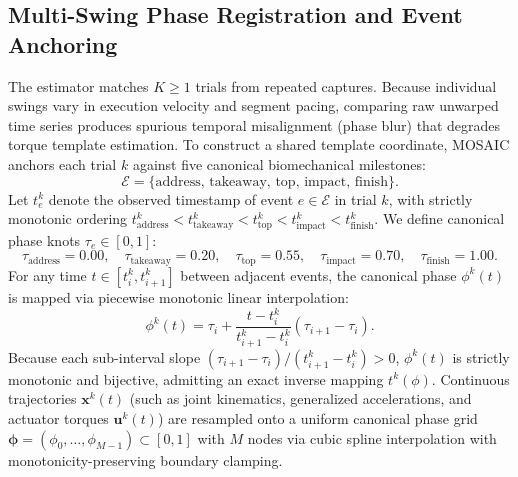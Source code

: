 \documentclass[11pt,a4paper]{article}
\newcommand{\bu}{\mathbf{u}}
\newcommand{\bx}{\mathbf{x}}
\begin{document}
\subsection{Multi-Swing Phase Registration and Event Anchoring}
\label{sec:registration}
The estimator matches $K \ge 1$ trials from repeated captures. Because individual swings vary in execution velocity and segment pacing, comparing raw unwarped time series produces spurious temporal misalignment (phase blur) that degrades torque template estimation. To construct a shared template coordinate, MOSAIC anchors each trial $k$ against five canonical biomechanical milestones:
\begin{equation}
\mathcal{E} = \{ \text{address},\, \text{takeaway},\, \text{top},\, \text{impact},\, \text{finish} \}.
\end{equation}
Let $t_e^k$ denote the observed timestamp of event $e \in \mathcal{E}$ in trial $k$, with strictly monotonic ordering $t_{\text{address}}^k < t_{\text{takeaway}}^k < t_{\text{top}}^k < t_{\text{impact}}^k < t_{\text{finish}}^k$. We define canonical phase knots $\tau_e \in [0, 1]$:
\begin{equation}
\tau_{\text{address}} = 0.00, \quad \tau_{\text{takeaway}} = 0.20, \quad \tau_{\text{top}} = 0.55, \quad \tau_{\text{impact}} = 0.70, \quad \tau_{\text{finish}} = 1.00.
\end{equation}
For any time $t \in [t_i^k, t_{i+1}^k]$ between adjacent events, the canonical phase $\phi^k(t)$ is mapped via piecewise monotonic linear interpolation:
\begin{equation}
\phi^k(t) = \tau_i + \frac{t - t_i^k}{t_{i+1}^k - t_i^k} (\tau_{i+1} - \tau_i).
\label{eq:phase_warp}
\end{equation}
Because each sub-interval slope $(\tau_{i+1} - \tau_i)/(t_{i+1}^k - t_i^k) > 0$, $\phi^k(t)$ is strictly monotonic and bijective, admitting an exact inverse mapping $t^k(\phi)$. Continuous trajectories $\bx^k(t)$ (such as joint kinematics, generalized accelerations, and actuator torques $\bu^k(t)$) are resampled onto a uniform canonical phase grid $\boldsymbol{\phi} = (\phi_0, \dots, \phi_{M-1}) \subset [0, 1]$ with $M$ nodes via cubic spline interpolation with monotonicity-preserving boundary clamping.
\end{document}
